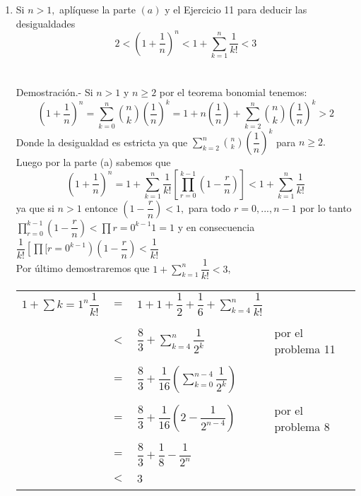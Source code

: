\begin{enumerate}
\begin{enumerate}[\bfseries (a)]
\item Si $n>1,$ aplíquese la parte $(a)$ y el Ejercicio 11 para deducir las desigualdades 
$$2 < \left( 1 + \dfrac{1}{n} \right)^n < 1 + \displaystyle\sum_{k=1}^n \dfrac{1}{k!} < 3 $$ \\\\
Demostración.- \; Si $n>1$ y $n\geq 2$ por el teorema bonomial tenemos:
$$\left( 1 + \dfrac{1}{n} \right)^n = \sum\limits_{k=0}^n {n \choose k} \left( \dfrac{1}{n} \right) ^k = 1 + n\left( \dfrac{1}{n} \right) + \sum\limits_{k=2}^n {n \choose k} \left( \dfrac{1}{n} \right)^k > 2$$
Donde la desigualdad es estricta ya que $\sum\limits_{k=2}^n {n \choose k} \left( \dfrac{1}{n} \right)^k $ para $n \geq 2.$\\
Luego por la parte (a) sabemos que $$\left( 1 + \dfrac{1}{n} \right) ^n = 1 + \sum\limits_{k=1}^n \dfrac{1}{k!} \left[ \prod\limits_{r=0}^{k-1} \left( 1 - \dfrac{r}{n} \right) \right] < 1 + \sum\limits_{k=1}^n \dfrac{1}{k!}$$
ya que si $n>1$ entonce $\left( 1 - \dfrac{r}{n} \right) < 1,$ para todo $ r = 0,...,n-1$ por lo tanto $\prod\limits_{r=0}^{k-1} \left( 1 - \dfrac{r}{n} \right) < \prod\limits{r=0}^{k-1} 1 = 1$ y en consecuencia $\dfrac{1}{k!} \left[ \prod\limits[{r=0}^{k-1} \right) \left( 1 - \dfrac{r}{n} \right) < \dfrac{1}{k!}$\\
Por último demostraremos que $1+ \sum\limits_{k=1}^n \dfrac{1}{k!} < 3$, 
\begin{center}
\begin{tabular}{rcll}
$1 + \sum\limits{k=1}^n \dfrac{1}{k!}$&$=$&$1+ 1 +\dfrac{1}{2} + \dfrac{1}{6} + \sum\limits_{k=4}^n \dfrac{1}{k!}$&\\\\
&$<$&$\dfrac{8}{3} + \sum\limits_{k=4}^n \dfrac{1}{2^k}$&por el problema 11\\\\
&$=$&$\dfrac{8}{3} + \dfrac{1}{16} \left( \sum\limits_{k=0}^{n-4} \dfrac{1}{2^k} \right)$&\\\\
&$=$&$\dfrac{8}{3} + \dfrac{1}{16} \left( 2 - \dfrac{1}{2^{n-4}} \right)$&por el problema 8\\\\
&$=$&$\dfrac{8}{3} + \dfrac{1}{8} - \dfrac{1}{2^n} $&\\\\
&$<$&$3$&\\\\
\end{tabular}
\end{center}
\end{enumerate}


\end{enumerate}
